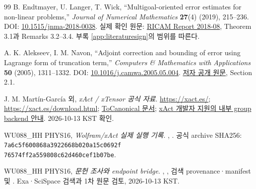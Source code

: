 \begin{thebibliography}{99}
 B. Endtmayer, U. Langer, T. Wick, ``Multigoal-oriented error estimates for non-linear problems,'' \emph{Journal of Numerical Mathematics} \textbf{27}(4) (2019), 215--236. DOI: \href{https://doi.org/10.1515/jnma-2018-0038}{10.1515/jnma-2018-0038}. 실제 확인 원문: \href{https://www.ricam.oeaw.ac.at/files/reports/18/rep18-08.pdf}{RICAM Report 2018-08}, Theorem 3.1과 Remarks 3.2--3.4. 부록 \ref{app:literaturesign}의 범위를 따른다.

 A. K. Alekseev, I. M. Navon, ``Adjoint correction and bounding of error using Lagrange form of truncation term,'' \emph{Computers \& Mathematics with Applications} \textbf{50} (2005), 1311--1332. DOI: \href{https://doi.org/10.1016/j.camwa.2005.05.004}{10.1016/j.camwa.2005.05.004}. \href{https://people.sc.fsu.edu/~inavon/pubs/CAM2005.pdf}{저자 공개 원문}, Section 2.1.

 J. M. Martín-García 외, \emph{xAct / xTensor 공식 자료}. \url{https://xact.es/}; \url{https://xact.es/download.html}; \href{https://xact.es/Documentation/HTML/HTMLLinks/xTensor/ToCanonical.nb.html}{ToCanonical 문서}; \href{https://groups.google.com/g/xact/c/U6vGTjEZVDE}{xAct 개발자 지원의 내부 group backend 안내}. 2026-10-13 KST 확인.

 WU088\_HH PHYS16, \emph{Wolfram/xAct 실제 실행 기록}. , . 공식 archive SHA256:
\texttt{7a6c5f600868a3922668b020a15c0692f}\\
\texttt{76574ff2a559808c62d460cef1b07be}.

 WU088\_HH PHYS16, \emph{문헌 조사와 endpoint bridge}. , , 검색 provenance·manifest 및 . Exa·SciSpace 검색과 1차 원문 검토, 2026-10-13 KST.
\end{thebibliography}
